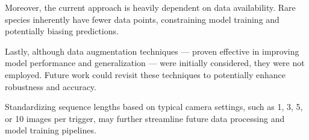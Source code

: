 Moreover, the current approach is heavily dependent on data availability.
Rare species inherently have fewer data points, constraining model training and potentially biasing predictions.

Lastly, although data augmentation techniques --- proven effective in improving model performance and generalization \autocite{shortenSurveyImageData2019} --- were initially considered, they were not employed.
Future work could revisit these techniques to potentially enhance robustness and accuracy.

Standardizing sequence lengths based on typical camera settings, such as 1, 3, 5, or 10 images per trigger, may further streamline future data processing and model training pipelines.